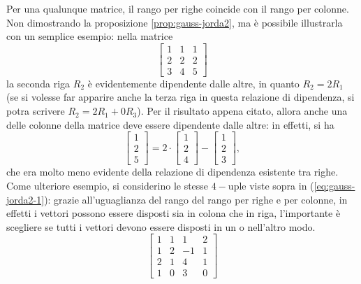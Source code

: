 \begin{prop}
  \label{prop:gauss-jorda2}
  Per una qualunque matrice, il rango per righe coincide con il
  rango per colonne.\\
  Non dimostrando la proposizione \ref{prop:gauss-jorda2}, ma è possibile
  illustrarla con un semplice esempio: nella matrice
  \begin{equation*}
    \begin{bmatrix}
      1 & 1 & 1\\
      2 & 2 & 2\\
      3 & 4 & 5
    \end{bmatrix}
  \end{equation*}
  la seconda riga $R_2$ è evidentemente dipendente dalle altre, in quanto
  $R_2=2R_1$ (se si volesse far apparire anche la terza riga in questa
  relazione di dipendenza, si potra scrivere $R_2=2R_1+0R_3$).
  Per il risultato appena citato, allora anche una delle colonne della
  matrice deve essere dipendente dalle altre: in effetti, si ha
  \begin{equation*}
    \begin{bmatrix}
      1 \\
      2\\
      5
    \end{bmatrix}=2 \cdot
    \begin{bmatrix}
      1 \\
      2\\
      4
    \end{bmatrix}-
    \begin{bmatrix}
      1\\
      2\\
      3
    \end{bmatrix},
  \end{equation*}
  che era molto meno evidente della relazione di dipendenza esistente tra
  righe. Come ulteriore esempio, si considerino le stesse $4-$uple viste
  sopra in (\ref{eq:gauss-jorda2-1}): grazie all'uguaglianza del rango
  del rango per righe e per colonne, in effetti i vettori possono essere
  disposti sia in colona che in riga, l'importante è scegliere se tutti
  i vettori devono essere disposti in un o nell'altro modo.
  \begin{equation*}
    \begin{bmatrix}
      1 & 1 & 1 & 2\\
      1 & 2 & -1 & 1 \\
      2 & 1 & 4 & 1 \\
      1 & 0 & 3 & 0
    \end{bmatrix}
  \end{equation*}
\end{prop}
